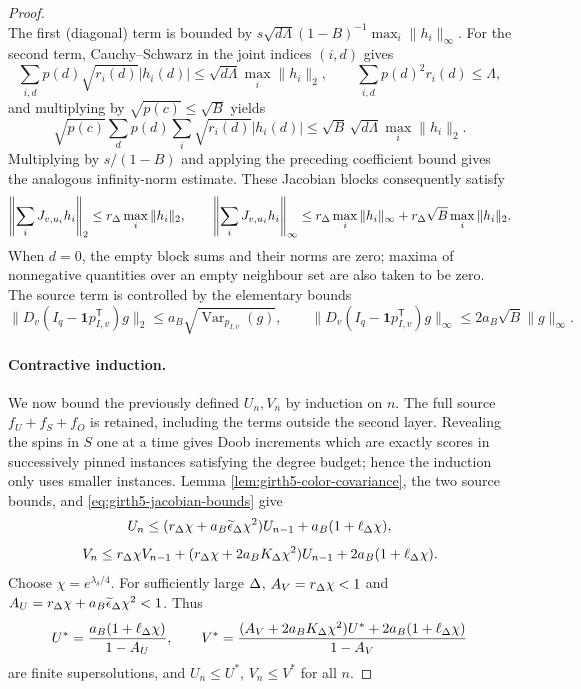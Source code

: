 \begin{proof}
\[\]
The first (diagonal) term is bounded by
$s\sqrt{d\Lambda}(1-B)^{-1}\max_i\|h_i\|_\infty$.
For the second term, Cauchy--Schwarz in the joint indices $(i,d)$ gives
\[
 \sum_{i,d}p(d)\sqrt{r_i(d)}|h_i(d)|
 \le \sqrt{d\Lambda}\max_i\|h_i\|_2,
 \qquad \sum_{i,d}p(d)^2r_i(d)\le\Lambda,
\]
and multiplying by $\sqrt{p(c)}\le\sqrt B$ yields
\[
 \sqrt{p(c)}\sum_d p(d)\sum_i\sqrt{r_i(d)}|h_i(d)|
 \le\sqrt B\,\sqrt{d\Lambda}\max_i\|h_i\|_2.
\]
Multiplying by $s/(1-B)$ and applying the preceding coefficient bound
gives the analogous infinity-norm estimate.  These Jacobian blocks consequently satisfy
\begin{equation}\label{eq:girth5-jacobian-bounds}
 \left\|\sum_iJ_{v,u_i}h_i\right\|_2
 \le r_\Delta\max_i\|h_i\|_2,\qquad
 \left\|\sum_iJ_{v,u_i}h_i\right\|_\infty
 \le r_\Delta\max_i\|h_i\|_\infty
 +r_\Delta\sqrt B\max_i\|h_i\|_2.
\end{equation}
When $d=0$, the empty block sums and their norms are zero; maxima of
nonnegative quantities over an empty neighbour set are also taken to be
zero.  The source term is controlled by the elementary bounds
\begin{equation}\label{eq:girth5-source-bounds}
 \|D_v(I_q-\mathbf1p_{I,v}^{\mathsf T})g\|_2
 \le a_B\sqrt{\operatorname{Var}_{p_{I,v}}(g)},
 \qquad
 \|D_v(I_q-\mathbf1p_{I,v}^{\mathsf T})g\|_\infty
 \le 2a_B\sqrt B\|g\|_\infty.
\end{equation}
\paragraph{Contractive induction.}
We now bound the previously defined $U_n,V_n$ by induction on $n$.
The full source $f_U+f_S+f_O$ is retained, including the terms outside
the second layer.  Revealing the spins in $S$ one at a time gives
Doob increments which are exactly scores in successively pinned instances
satisfying the degree budget; hence the induction only uses smaller instances.  Lemma
\ref{lem:girth5-color-covariance}, the two source bounds, and \eqref{eq:girth5-jacobian-bounds} give
\begin{equation}\label{eq:girth5-U-recursion}
 U_n\le (r_\Delta\chi+a_B\widetilde\epsilon_\Delta\chi^2)U_{n-1}
       +a_B(1+\ell_\Delta\chi),
\end{equation}
\begin{equation}\label{eq:girth5-V-recursion}
 V_n\le r_\Delta\chi V_{n-1}
 +(r_\Delta\chi+2a_BK_\Delta\chi^2)U_{n-1}
 +2a_B(1+\ell_\Delta\chi).
\end{equation}
Choose $\chi=e^{\lambda_\delta/4}$.  For sufficiently large $\Delta$,
$A_V=r_\Delta\chi<1$ and
$A_U=r_\Delta\chi+a_B\widetilde\epsilon_\Delta\chi^2<1$.  Thus
\begin{equation}\label{eq:girth5-supersolutions}
 U^*=\frac{a_B(1+\ell_\Delta\chi)}{1-A_U},\qquad
 V^*=\frac{(A_V+2a_BK_\Delta\chi^2)U^*
 +2a_B(1+\ell_\Delta\chi)}{1-A_V}
\end{equation}
are finite supersolutions, and $U_n\le U^*$, $V_n\le V^*$ for all $n$.


\end{proof}
